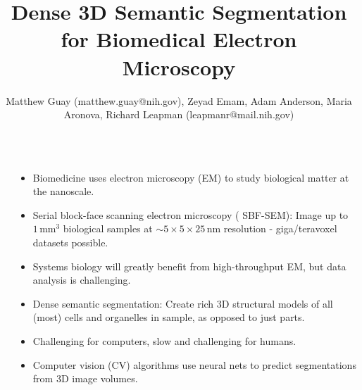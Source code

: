 \documentclass[final]{beamer}
\title{Dense 3D Semantic Segmentation for Biomedical Electron Microscopy} %
\author{{Matthew Guay (matthew.guay@nih.gov),} {Zeyad Emam,} {Adam Anderson,} {Maria Aronova,} {Richard Leapman (leapmanr@mail.nih.gov)}}%
\institute{\textbf{Laboratory of Cellular Imaging and Macromolecular Biophysics, NIBIB, NIH}} %
\newlength{\sepwid}
\newlength{\onecolwid}
\renewcommand{\emph}[1]{{\color{nibib2} #1}}
\begin{document}
\begin{frame}[t] %

\begin{columns}[t] %

\begin{column}{\sepwid}\end{column} %


\begin{column}{\onecolwid}

    \begin{tcolorbox}[title=Introduction]
        \begin{itemize}
            \item Biomedicine uses \emph{electron microscopy} (EM) to study biological matter at the nanoscale.
            \item Serial block-face scanning electron microscopy (\emph{SBF-SEM}): Image up to $1\,\text{mm}^3$ biological samples at $\sim 5\times 5\times 25\,\text{nm}$ resolution - giga/teravoxel datasets possible.
            \item \emph{Systems biology} will greatly benefit from high-throughput EM, but data analysis is challenging.
            \item \emph{Dense semantic segmentation}: Create rich 3D structural models of all (most) cells and organelles in sample, as opposed to just parts.            
            \item Challenging for computers, slow and challenging for humans.
            \item \emph{Computer vision} (CV) algorithms use neural nets to predict segmentations from 3D image volumes.
            
        \end{itemize}
    \end{tcolorbox}
    

\end{column}
\end{columns}
\end{frame}
\end{document}

